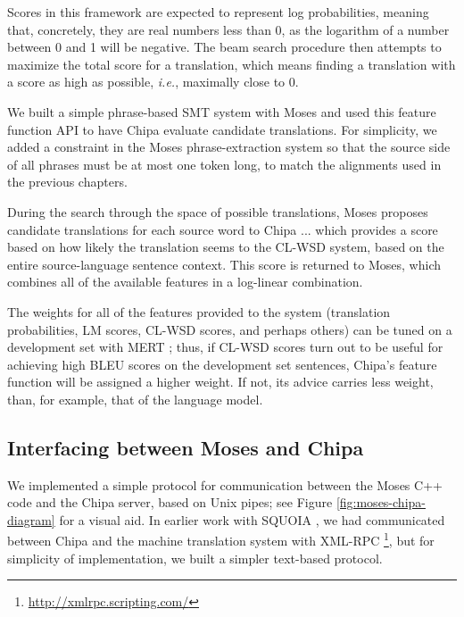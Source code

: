 Scores in this framework are expected to represent log probabilities, meaning
that, concretely, they are real numbers less than 0, as the logarithm of a
number between 0 and 1 will be negative. The beam search procedure then
attempts to maximize the total score for a translation, which means finding a
translation with a score as high as possible, \emph{i.e.}, maximally close to
0.

We built a simple phrase-based SMT system with Moses and used this feature
function API to have Chipa evaluate candidate translations.
For simplicity, we added a constraint in the Moses phrase-extraction system
so that the source side of all phrases must be at most one token long, to match
the alignments used in the previous chapters.

During the search through the space of possible translations, Moses proposes
candidate translations for each source word to Chipa ...
which provides a score based on how likely the translation seems to the CL-WSD
system, based on the entire source-language sentence context. This score is
returned to Moses, which combines all of the available features in a log-linear
combination.

The weights for all of the features provided to the system (translation
probabilities, LM scores, CL-WSD scores, and perhaps others) can be tuned on a
development set with MERT \cite{och:2003:ACL}; thus, if CL-WSD scores turn out
to be useful for achieving high BLEU scores on the development set sentences,
Chipa's feature function will be assigned a higher weight. If not, its advice
carries less weight, than, for example, that of the language model.


\subsection{Interfacing between Moses and Chipa}
We implemented a simple protocol for communication between the Moses C++ code
and the Chipa server, based on Unix pipes; see Figure
\ref{fig:moses-chipa-diagram} for a visual aid. In earlier work with SQUOIA
\cite{rudnick:saltmil2014}, we had communicated between Chipa and the machine
translation system with XML-RPC \footnote{\url{http://xmlrpc.scripting.com/}},
but for simplicity of implementation, we built a simpler text-based protocol.

